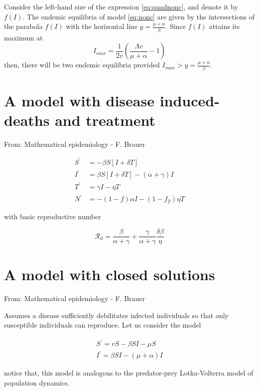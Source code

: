 \documentclass{book}\usepackage[]{graphicx}\usepackage[]{color}
\begin{document}
Consider the left-hand size of the expression \eqref{eq:quadnonc}, and denote it by $f(I)$. The endemic equilibria of model \eqref{eq:nonc} are given by the intersections of the parabola $f(I)$ with the horizontal line $y=\frac{\mu+\alpha}{\beta}$.
Since $f(I)$ attains its maximum at \begin{equation}
I_{max}=\frac{1}{2 v}\left(\frac{\Lambda v}{\mu+\alpha}-1\right)
\end{equation}
then, there will be two endemic equilibria provided $I_{max}>y=\frac{\mu+\alpha}{\beta}$.

\section{A model with disease induced-deaths and treatment}
From: Mathematical epidemiology - F. Brauer

\begin{align}
S^{\prime} &=-\beta S[I+\delta T] \\ 
I^{\prime} &=\beta S[I+\delta T]-(\alpha+\gamma) I \\ 
T^{\prime} &=\gamma I-\eta T \\ N^{\prime} &=-(1-f) \alpha I-\left(1-f_{T}\right) \eta T 
\end{align}

with basic reproductive number

\begin{equation}
\mathcal{R}_{0}=\frac{\beta}{\alpha+\gamma}+\frac{\gamma}{\alpha+\gamma} \frac{\delta \beta}{\eta}
\end{equation}

\section{A model with closed solutions}
From: Mathematical epidemiology - F. Brauer

Assumes a disease sufficiently debilitates infected individuals so that only susceptible individuals can reproduce. Let us consider the model

\begin{equation}
\begin{array}{l}
S^{\prime}=r S-\beta S I-\mu S \\
I^{\prime}=\beta S I-(\mu+\alpha) I
\end{array}
\end{equation}

notice that, this model is analogous to the predator-prey Lotka-Volterra model of population dynamics.
\end{document}
